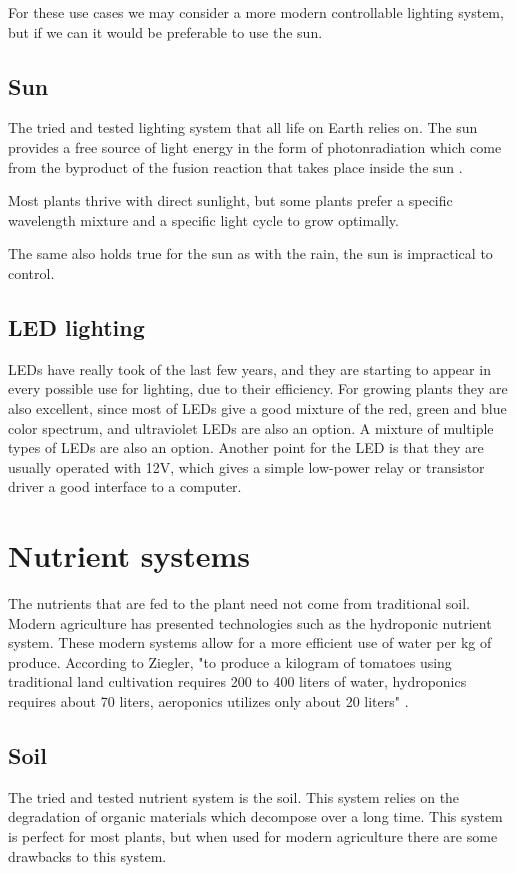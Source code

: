 \documentclass[a4paper,12pt,twoside,openright,titlepage]{book}
\begin{document}
For these use cases we may consider a more modern controllable lighting system, but if we can it would be preferable to use the sun.

\subsection{Sun}
The tried and tested lighting system that all life on Earth relies on.
The sun provides a free source of light energy in the form of photonradiation which come from the byproduct of the fusion reaction that takes place inside the sun \cite{abhyankar}.

Most plants thrive with direct sunlight, but some plants prefer a specific wavelength mixture and a specific light cycle to grow optimally.

The same also holds true for the sun as with the rain, the sun is impractical to control.

\subsection{LED lighting}
LEDs have really took of the last few years, and they are starting to appear in every possible use for lighting, due to their efficiency.
For growing plants they are also excellent, since most of LEDs give a good mixture of the red, green and blue color spectrum, and ultraviolet LEDs are also an option.
A mixture of multiple types of LEDs are also an option.
Another point for the LED is that they are usually operated with 12V, which gives a simple low-power relay or transistor driver a good interface to a computer.

\section{Nutrient systems}
The nutrients that are fed to the plant need not come from traditional soil.
Modern agriculture has presented technologies such as the hydroponic nutrient system.
These modern systems allow for a more efficient use of water per kg of produce.
According to Ziegler, "to produce a kilogram of tomatoes using traditional land
cultivation requires 200 to 400 liters of water, hydroponics requires about 70 liters,
aeroponics utilizes only about 20 liters" \cite{aeroponic}.

\subsection{Soil}
The tried and tested nutrient system is the soil. This system relies on the degradation of organic materials which decompose over a long time. This system is perfect for most plants, but when used for modern agriculture there are some drawbacks to this system.
\end{document}
